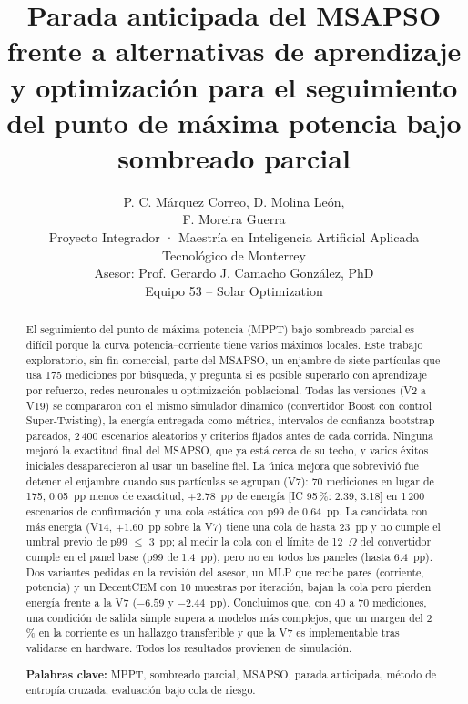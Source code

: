 \documentclass[letterpaper,11pt]{article}
\title{\textbf{Parada anticipada del MSAPSO frente a alternativas de aprendizaje y optimización para el seguimiento del punto de máxima potencia bajo sombreado parcial}}
\author{P. C. Márquez Correo, D. Molina León,\\[2pt]
  F. Moreira Guerra\\[6pt]
  \normalsize Proyecto Integrador · Maestría en Inteligencia Artificial Aplicada\\
  \normalsize Tecnológico de Monterrey\\[4pt]
  \normalsize Asesor: Prof. Gerardo J. Camacho González, PhD\\[4pt]
  \normalsize Equipo 53 -- Solar Optimization}
\begin{document}
\renewcommand{\abstractname}{Resumen}
\renewcommand{\tablename}{Tabla}
\renewcommand{\figurename}{Figura}

\maketitle

\begin{abstract}
El seguimiento del punto de máxima potencia (MPPT) bajo sombreado parcial es difícil porque la curva potencia--corriente tiene varios máximos locales. Este trabajo exploratorio, sin fin comercial, parte del MSAPSO, un enjambre de siete partículas que usa 175 mediciones por búsqueda, y pregunta si es posible superarlo con aprendizaje por refuerzo, redes neuronales u optimización poblacional. Todas las versiones (V2 a V19) se compararon con el mismo simulador dinámico (convertidor Boost con control Super-Twisting), la energía entregada como métrica, intervalos de confianza bootstrap pareados, 2\,400 escenarios aleatorios y criterios fijados antes de cada corrida. Ninguna mejoró la exactitud final del MSAPSO, que ya está cerca de su techo, y varios éxitos iniciales desaparecieron al usar un baseline fiel. La única mejora que sobrevivió fue detener el enjambre cuando sus partículas se agrupan (V7): 70 mediciones en lugar de 175, 0.05~pp menos de exactitud, +2.78~pp de energía [IC 95\,\%: 2.39, 3.18] en 1\,200 escenarios de confirmación y una cola estática con p99 de 0.64~pp. La candidata con más energía (V14, +1.60~pp sobre la V7) tiene una cola de hasta 23~pp y no cumple el umbral previo de p99 $\leq$ 3~pp; al medir la cola con el límite de 12~$\Omega$ del convertidor cumple en el panel base (p99 de 1.4~pp), pero no en todos los paneles (hasta 6.4~pp). Dos variantes pedidas en la revisión del asesor, un MLP que recibe pares (corriente, potencia) y un DecentCEM con 10 muestras por iteración, bajan la cola pero pierden energía frente a la V7 ($-6.59$ y $-2.44$~pp). Concluimos que, con 40 a 70 mediciones, una condición de salida simple supera a modelos más complejos, que un margen del 2\,\% en la corriente es un hallazgo transferible y que la V7 es implementable tras validarse en hardware. Todos los resultados provienen de simulación.

\medskip
\noindent\textbf{Palabras clave:} MPPT, sombreado parcial, MSAPSO, parada anticipada, método de entropía cruzada, evaluación bajo cola de riesgo.
\end{abstract}
\end{document}
